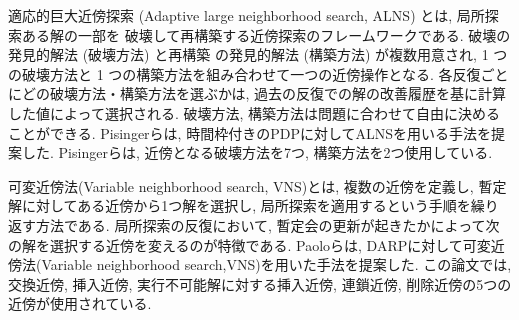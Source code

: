 適応的巨大近傍探索 (Adaptive large neighborhood search, ALNS) とは, 局所探索ある解の一部を 破壊して再構築する近傍探索のフレームワークである\cite{ALNS}. 破壊の発見的解法 (破壊方法) と再構築 の発見的解法 (構築方法) が複数用意され, 1 つの破壊方法と 1 つの構築方法を組み合わせて一つの近傍操作となる. 各反復ごとにどの破壊方法・構築方法を選ぶかは, 過去の反復での解の改善履歴を基に計算した値によって選択される. 破壊方法, 構築方法は問題に合わせて自由に決めることができる.
Pisingerらは, 時間枠付きのPDPに対してALNSを用いる手法を提案した\cite{pisinger}. Pisingerらは, 近傍となる破壊方法を7つ, 構築方法を2つ使用している.

可変近傍法(Variable neighborhood search, VNS)とは, 複数の近傍を定義し, 暫定解に対してある近傍から1つ解を選択し, 局所探索を適用するという手順を繰り返す方法である. 局所探索の反復において, 暫定会の更新が起きたかによって次の解を選択する近傍を変えるのが特徴である. Paoloらは, DARPに対して可変近傍法(Variable neighborhood search,VNS)を用いた手法を提案した\cite{VNS}. この論文では, 交換近傍, 挿入近傍, 実行不可能解に対する挿入近傍, 連鎖近傍, 削除近傍の5つの近傍が使用されている.
